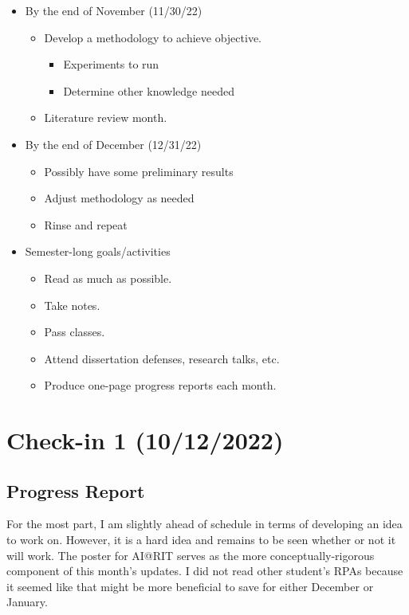 \documentclass{article}
\begin{document}
\begin{itemize}
	\item By the end of November (11/30/22)
	\begin{itemize}
		\item Develop a methodology to achieve objective.
		\begin{itemize}
			\item Experiments to run
			\item Determine other knowledge needed
		\end{itemize}
		\item Literature review month.
	\end{itemize}
	\item By the end of December (12/31/22)
	\begin{itemize}
		\item Possibly have some preliminary results
		\item Adjust methodology as needed
		\item Rinse and repeat
	\end{itemize}
	\item Semester-long goals/activities
	\begin{itemize}
		\item Read as much as possible.
		\item Take notes.
		\item Pass classes.
		\item Attend dissertation defenses, research talks, etc.
		\item Produce one-page progress reports each month.
	\end{itemize}
\end{itemize}

\section*{Check-in 1 (10/12/2022)}

\subsection*{Progress Report}

For the most part, I am slightly ahead of schedule in terms of developing an idea to work on. However, it is a hard idea and remains to be seen whether or not it will work. The poster for AI@RIT serves as the more conceptually-rigorous component of this month's updates. I did not read other student's RPAs because it seemed like that might be more beneficial to save for either December or January.
\end{document}
